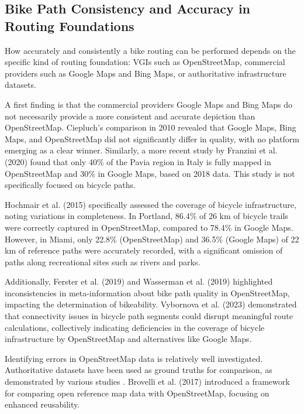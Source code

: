 \subsection{Bike Path Consistency and Accuracy in Routing Foundations}

How accurately and consistently a bike routing can be performed depends on the specific kind of routing foundation: VGIs such as OpenStreetMap, commercial providers such as Google Maps and Bing Maps, or authoritative infrastructure datasets.

A first finding is that the commercial providers Google Maps and Bing Maps do not necessarily provide a more consistent and accurate depiction than OpenStreetMap. Ciepluch's comparison in 2010 \cite{ciepluch_comparison_2010} revealed that Google Maps, Bing Maps, and OpenStreetMap did not significantly differ in quality, with no platform emerging as a clear winner. Similarly, a more recent study by Franzini et al. (2020) \cite{franzini_assessment_2020} found that only 40\% of the Pavia region in Italy is fully mapped in OpenStreetMap and 30\% in Google Maps, based on 2018 data. This study is not specifically focused on bicycle paths.

Hochmair et al. (2015) \cite{hochmair_assessing_2015}  specifically assessed the coverage of bicycle infrastructure, noting variations in completeness. In Portland, 86.4\% of 26 km of bicycle trails were correctly captured in OpenStreetMap, compared to 78.4\% in Google Maps. However, in Miami, only 22.8\% (OpenStreetMap) and 36.5\% (Google Maps) of 22 km of reference paths were accurately recorded, with a significant omission of paths along recreational sites such as rivers and parks. 

Additionally, Ferster et al. (2019) \cite{ferster_using_2019} and Wasserman et al. (2019) \cite{wasserman_evaluating_2019} highlighted inconsistencies in meta-information about bike path quality in OpenStreetMap, impacting the determination of bikeability. Vybornova et al. (2023) \cite{vybornova_automated_2023} demonstrated that connectivity issues in bicycle path segments could disrupt meaningful route calculations, collectively indicating deficiencies in the coverage of bicycle infrastructure by OpenStreetMap and alternatives like Google Maps.

Identifying errors in OpenStreetMap data is relatively well investigated. Authoritative datasets have been used as ground truths for comparison, as demonstrated by various studies \cite{haklay_how_2010, jokar_arsanjani_quality_2015, ludwig_comparison_2011}. Brovelli et al. (2017) \cite{brovelli_towards_2017} introduced a framework for comparing open reference map data with OpenStreetMap, focusing on enhanced reusability. 


